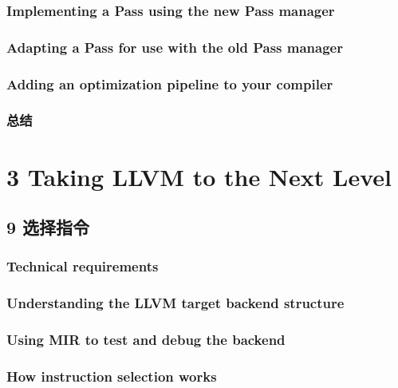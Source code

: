 \documentclass[11pt,a4paper,UTF8]{ctexart}
\begin{document}
		\subsubsection{Implementing a Pass using the new Pass manager}
		\subsubsection{Adapting a Pass for use with the old Pass manager}
		\subsubsection{Adding an optimization pipeline to your compiler}
		\subsubsection{总结}
	
	\pagecolor{mygray}
	\color{white}
	\section*{ 3 Taking LLVM to the Next Level}
	\color{black}
	\pagecolor{white}
	
	\subsection{9 选择指令}
		\subsubsection{Technical requirements}
		\subsubsection{Understanding the LLVM target backend structure}
		\subsubsection{Using MIR to test and debug the backend}
		\subsubsection{How instruction selection works}		
\end{document}
